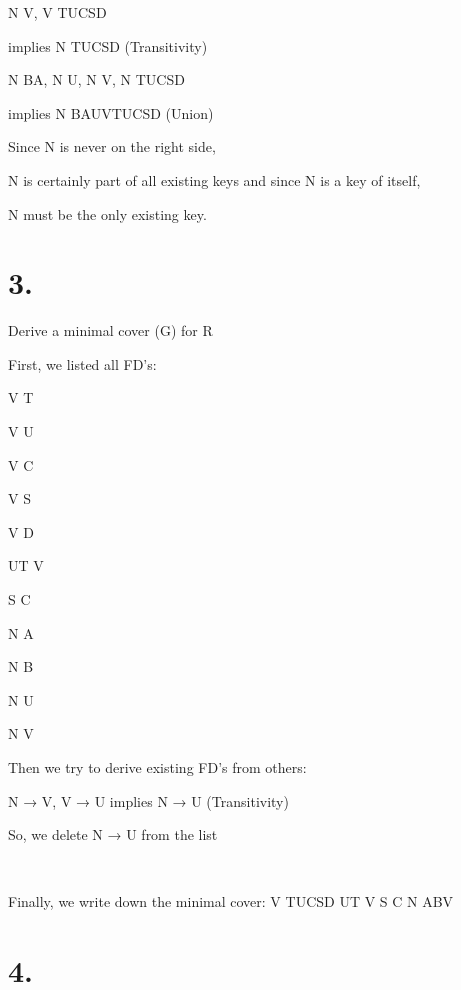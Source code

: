 \documentclass{article}
\begin{document}
\newline


	N \rightarrow V, V \rightarrow TUCSD 
	
	implies N \rightarrow TUCSD					(Transitivity)
	
\newline
	
	N \rightarrow BA, N \rightarrow U, N \rightarrow V, N \rightarrow TUCSD 
	
	implies N \rightarrow BAUVTUCSD		(Union)
\newline
	
Since N is never on the right side, 

N is certainly part of all existing keys and since N is a key of itself,

N must be the only existing key.

\newline

\chapter{3.} Derive a minimal cover (G) for R

First, we listed all FD's:

	V \rightarrow T
	
	V \rightarrow U
	
	V \rightarrow C
	
	V \rightarrow S
	
	V \rightarrow D
	
	UT \rightarrow V
	
	S \rightarrow C
	
	N \rightarrow A
	
	N \rightarrow B
	
	N \rightarrow U
	
	N \rightarrow V

	Then we try to derive existing FD's from others:
	
	N → V, V → U implies N → U						(Transitivity)
	
	So, we delete N → U from the list
	
	\\
\newline

	Finally, we write down the minimal cover:
	V \rightarrow TUCSD
	UT \rightarrow V
	S \rightarrow C
	N \rightarrow ABV
	
	\newline	\break

\chapter{4.}
\end{document}
